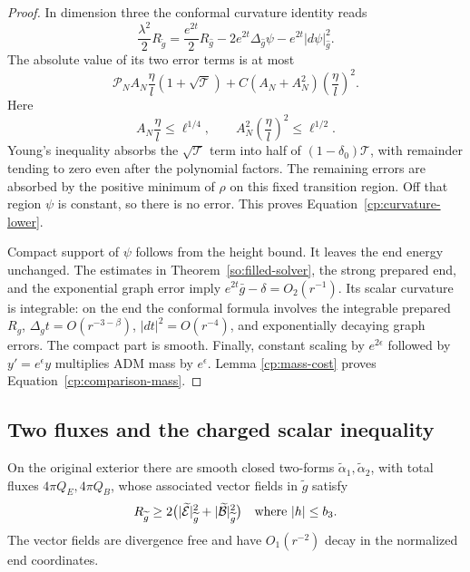 \begin{proof}
In dimension three the conformal curvature identity reads
\begin{equation}\label{cp:conformal-curvature}
 \frac{\lambda^2}{2}R_{\widetilde g}
 =\frac{e^{2t}}2R_{\widehat g}
       -2e^{2t}\Delta_{\widehat g}\psi
       -e^{2t}|d\psi|_{\widehat g}^2.
\end{equation}
The absolute value of its two error terms is at most
\[
 \mathcal P_N A_N\frac\eta l(1+\sqrt{\mathcal T})
 +C(A_N+A_N^2)\left(\frac\eta l\right)^2.
\]
Here
\[
 A_N\frac\eta l\le\ell^{1/4},\qquad
 A_N^2\left(\frac\eta l\right)^2\le\ell^{1/2}.
\]
Young's inequality absorbs the $\sqrt{\mathcal T}$ term into half of
$(1-\delta_0)\mathcal T$, with remainder tending to zero even after
the polynomial factors.  The remaining errors are absorbed by the
positive minimum of $\rho$ on this fixed transition region.  Off that
region $\psi$ is constant, so there is no error.  This proves
Equation~\eqref{cp:curvature-lower}.

Compact support of $\psi$ follows from the height bound.  It leaves
the end energy unchanged.  The estimates in
Theorem~\ref{so:filled-solver}, the strong prepared end, and the
exponential graph error imply
$e^{2t}\bar g-\delta=O_2(r^{-1})$.  Its scalar curvature is integrable:
on the end the conformal formula involves the integrable prepared
$R_g$, $\Delta_g t=O(r^{-3-\beta})$, $|dt|^2=O(r^{-4})$, and
exponentially decaying graph errors.  The compact part is smooth.
Finally, constant scaling by $e^{2\epsilon}$ followed by
$y'=e^\epsilon y$ multiplies ADM mass by $e^\epsilon$.  Lemma
\ref{cp:mass-cost} proves Equation~\eqref{cp:comparison-mass}.
\end{proof}

\subsection{Two fluxes and the charged scalar inequality}

\begin{lemma}\label{cp:flux-projection}
On the original exterior there are smooth closed two-forms
$\widetilde\alpha_1,\widetilde\alpha_2$, with total fluxes
$4\pi Q_E,4\pi Q_B$, whose associated vector fields in
$\widetilde g$ satisfy
\begin{equation}\label{cp:charged-scalar}
 R_{\widetilde g}\ge
 2\bigl(|\widetilde{\mathcal E}|_{\widetilde g}^2
        +|\widetilde{\mathcal B}|_{\widetilde g}^2\bigr)
 \quad\hbox{where } |h|\le b_3.
\end{equation}
The vector fields are divergence free and have $O_1(r^{-2})$ decay
in the normalized end coordinates.
\end{lemma}

